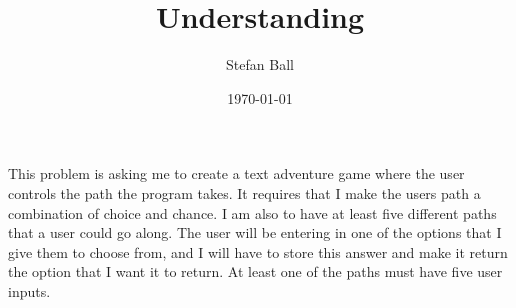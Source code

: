 \documentclass{article}
\title{Understanding}
\author{Stefan Ball}
\date{\today}
\begin{document}
\maketitle

This problem is asking me to create a text adventure game where the user controls the path the program takes. It requires that I make the users path a combination of choice and chance. I am also to have at least five different paths that a user could go along. The user will be entering in one of the options that I give them to choose from, and I will have to store this answer and make it return the option that I want it to return. At least one of the paths must have five user inputs.





    


















\end{document}
